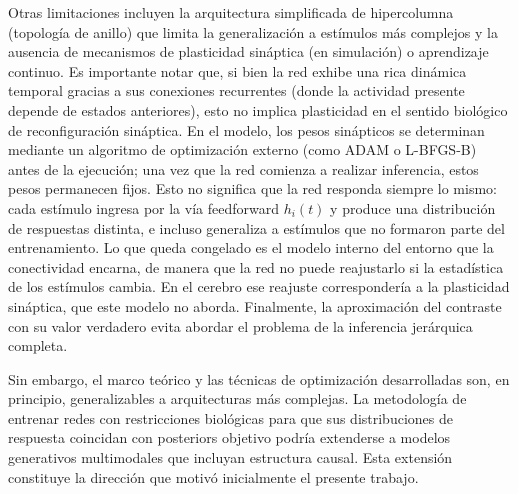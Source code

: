 Otras limitaciones incluyen la arquitectura simplificada de hipercolumna (topología de anillo) que limita la generalización a estímulos más complejos y la ausencia de mecanismos de plasticidad sináptica (en simulación) o aprendizaje continuo. Es importante notar que, si bien la red exhibe una rica dinámica temporal gracias a sus conexiones recurrentes (donde la actividad presente depende de estados anteriores), esto no implica plasticidad en el sentido biológico de reconfiguración sináptica. En el modelo, los pesos sinápticos se determinan mediante un algoritmo de optimización externo (como ADAM o L-BFGS-B) antes de la ejecución; una vez que la red comienza a realizar inferencia, estos pesos permanecen fijos. Esto no significa que la red responda siempre lo mismo: cada estímulo ingresa por la vía feedforward $h_i(t)$ y produce una distribución de respuestas distinta, e incluso generaliza a estímulos que no formaron parte del entrenamiento. Lo que queda congelado es el modelo interno del entorno que la conectividad encarna, de manera que la red no puede reajustarlo si la estadística de los estímulos cambia. En el cerebro ese reajuste correspondería a la plasticidad sináptica, que este modelo no aborda. Finalmente, la aproximación del contraste con su valor verdadero evita abordar el problema de la inferencia jerárquica completa.

Sin embargo, el marco teórico y las técnicas de optimización desarrolladas son, en principio, generalizables a arquitecturas más complejas. La metodología de entrenar redes con restricciones biológicas para que sus distribuciones de respuesta coincidan con posteriors objetivo podría extenderse a modelos generativos multimodales que incluyan estructura causal. Esta extensión constituye la dirección que motivó inicialmente el presente trabajo.

